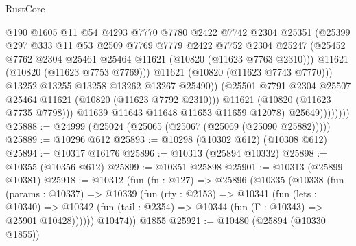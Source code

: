 \begin{lexlean}{RustCore}
\begin{coremodule}
                              @190
                              @1605
                              @11
                              @54
                              @4293
                              @7770
                              @7780
                              @2422
                              @7742
                              @2304
                              @25351
                              (@25399
                                @297
                                @333
                                @11
                                @53
                                @2509
                                @7769
                                @7779
                                @2422
                                @7752
                                @2304
                                @25247
                                (@25452
                                  @7762
                                  @2304
                                  @25461
                                  @25464
                                  @11621
                                  (@10820 (@11623 @7763 @2310)))
                                @11621
                                (@10820 (@11623 @7753 @7769)))
                              @11621
                              (@10820 (@11623 @7743 @7770)))
                            @13252
                            @13255
                            @13258
                            @13262
                            @13267
                            @25490))
                        (@25501 @7791 @2304 @25507 @25464 @11621 (@10820 (@11623 @7792 @2310)))
                        @11621
                        (@10820 (@11623 @7735 @7798)))
                      @11639
                      @11643
                      @11648
                      @11653
                      @11659
                      @12078)
                    @25649))))))))
@25888 := @24999 (@25024 (@25065 (@25067 (@25069 (@25090 @25882)))))
@25889 := @10296 @612
@25893 := @10298 (@10302 @612) (@10308 @612)
@25894 := @10317 @16176
@25896 := @10313 (@25894 @10332)
@25898 := @10355 (@10356 @612)
@25899 := @10351 @25898
@25901 := @10313 (@25899 @10381)
@25918 := @10312
    (fun (fn : @127) =>
    @25896
      (@10335
        (@10338
          (fun (params : @10337) =>
          @10339
            (fun (rty : @2153) =>
            @10341
              (fun (lets : @10340) =>
              @10342 (fun (tail : @2354) => @10344 (fun (Γ : @10343) => @25901 @10428))))))
        @10474))
    @1855
@25921 := @10480 (@25894 (@10330 @1855))

\end{coremodule}
\end{lexlean}
